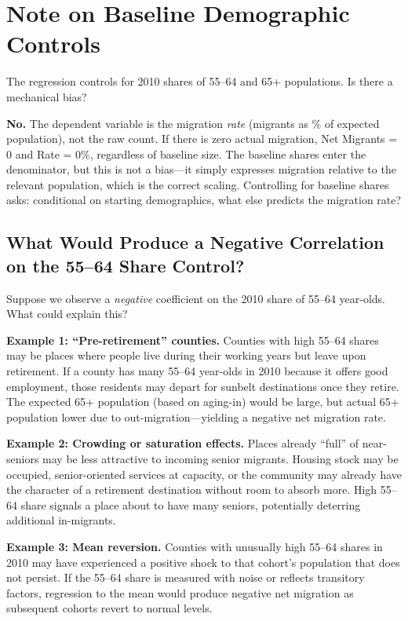 
\section{Note on Baseline Demographic Controls}
\label{app:mechanical}

The regression controls for 2010 shares of 55--64 and 65+ populations. Is there a mechanical bias?

\textbf{No.} The dependent variable is the migration \textit{rate} (migrants as \% of expected population), not the raw count. If there is zero actual migration, Net Migrants = 0 and Rate = 0\%, regardless of baseline size. The baseline shares enter the denominator, but this is not a bias---it simply expresses migration relative to the relevant population, which is the correct scaling. Controlling for baseline shares asks: conditional on starting demographics, what else predicts the migration rate?

\subsection{What Would Produce a Negative Correlation on the 55--64 Share Control?}

Suppose we observe a \textit{negative} coefficient on the 2010 share of 55--64 year-olds. What could explain this?

\textbf{Example 1: ``Pre-retirement'' counties.} Counties with high 55--64 shares may be places where people live during their working years but leave upon retirement. If a county has many 55--64 year-olds in 2010 because it offers good employment, those residents may depart for sunbelt destinations once they retire. The expected 65+ population (based on aging-in) would be large, but actual 65+ population lower due to out-migration---yielding a negative net migration rate.

\textbf{Example 2: Crowding or saturation effects.} Places already ``full'' of near-seniors may be less attractive to incoming senior migrants. Housing stock may be occupied, senior-oriented services at capacity, or the community may already have the character of a retirement destination without room to absorb more. High 55--64 share signals a place about to have many seniors, potentially deterring additional in-migrants.

\textbf{Example 3: Mean reversion.} Counties with unusually high 55--64 shares in 2010 may have experienced a positive shock to that cohort's population that does not persist. If the 55--64 share is measured with noise or reflects transitory factors, regression to the mean would produce negative net migration as subsequent cohorts revert to normal levels.


